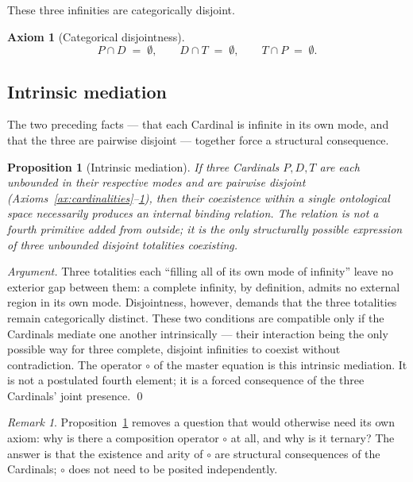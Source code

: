 \documentclass[11pt,a4paper]{article}
\newtheorem{proposition}[theorem]{Proposition}
\theoremstyle{definition}
\newtheorem{axiom}[theorem]{Axiom}
\theoremstyle{remark}
\newtheorem{remark}[theorem]{Remark}
\begin{document}
These three infinities are categorically disjoint.

\begin{axiom}[Categorical disjointness]\label{ax:disjoint}
\[
P \cap D \;=\; \emptyset, \qquad D \cap T \;=\; \emptyset, \qquad T \cap P \;=\; \emptyset.
\]
\end{axiom}

\subsection{Intrinsic mediation}

The two preceding facts --- that each Cardinal is infinite in its own mode, and that the three are pairwise disjoint --- together force a structural consequence.

\begin{proposition}[Intrinsic mediation]\label{prop:intrinsic}
If three Cardinals $P,D,T$ are each unbounded in their respective modes and are pairwise disjoint (Axioms~\ref{ax:cardinalities}--\ref{ax:disjoint}), then their coexistence within a single ontological space necessarily produces an internal binding relation. The relation is not a fourth primitive added from outside; it is the only structurally possible expression of three unbounded disjoint totalities coexisting.
\end{proposition}

\begin{proof}[Argument]
Three totalities each ``filling all of its own mode of infinity'' leave no exterior gap between them: a complete infinity, by definition, admits no external region in its own mode. Disjointness, however, demands that the three totalities remain categorically distinct. These two conditions are compatible only if the Cardinals mediate one another intrinsically --- their interaction being the only possible way for three complete, disjoint infinities to coexist without contradiction. The operator $\circ$ of the master equation is this intrinsic mediation. It is not a postulated fourth element; it is a forced consequence of the three Cardinals' joint presence. \qed
\end{proof}

\begin{remark}
Proposition~\ref{prop:intrinsic} removes a question that would otherwise need its own axiom: why is there a composition operator $\circ$ at all, and why is it ternary? The answer is that the existence and arity of $\circ$ are structural consequences of the Cardinals; $\circ$ does not need to be posited independently.
\end{remark}
\end{document}

